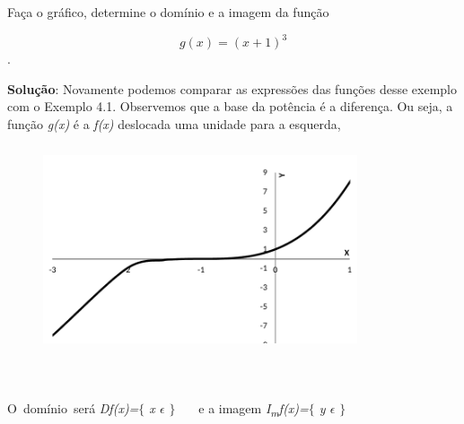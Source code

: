 \begin{texemplo}
Faça o gráfico, determine o domínio e a imagem da função 

\quad  $$ g \left( x \right) = \left( x+1 \right) ^{3}$$.

\begin{justify}
\textbf{Solução}: Novamente podemos comparar as expressões das funções desse exemplo com o Exemplo 4.1. Observemos que a base da potência é a diferença. Ou seja, a função \textit{g(x)} é a \textit{f(x)} deslocada uma unidade para a esquerda,
\end{justify}

\begin{figure}[H]
	\begin{Center}
		\includegraphics[width=3.65in,height=2.41in]{capitulos/outras_funcoes/media/image18.pdf}
	\end{Center}
\end{figure}

~~

\begin{justify}
O~domínio~será   \textit{Df(x)=$ \{ $ x $ \epsilon $  \textbf{ }$ \} $ }~~~e a imagem  \textit{I\textsubscript{m}f(x)=$ \{ $ y $ \epsilon $  $ \} $ }~ \qedsymbol{}
\end{justify}
\end{texemplo}

